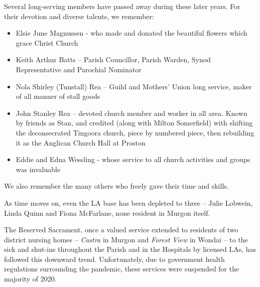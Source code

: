 \newpage


Several long-serving members have passed away during these later years. For their devotion and diverse talents, we remember:



\begin{itemize}

\item

  Elsie June Magnussen - who made and donated the beautiful flowers which grace Christ Church

\item

  Keith Arthur Batts -- Parish Councillor, Parish Warden, Synod Representative and Parochial Nominator

\item

  Nola Shirley (Tunstall) Rea -- Guild and Mothers' Union long service, maker of all manner of stall goods

\item

  John Stanley Rea -- devoted church member and worker in all area. Known by friends as Stan, and credited (along with Milton Somerfield) with shifting the deconsecrated Tingoora church, piece by numbered piece, then rebuilding it as the Anglican Church Hall at Proston

\item

  Eddie and Edna Wessling - whose service to all church activities and groups was invaluable

\end{itemize}



We also remember the many others who freely gave their time and skills.



\balance


As time moves on, even the LA base has been depleted to three -- Julie Lobwein, Linda Quinn and Fiona McFarlane, none resident in Murgon itself.



The Reserved Sacrament, once a valued service extended to residents of two district nursing homes -- \emph{Castra} in Murgon and \emph{Forest View} in Wondai -- to the sick and shut-ins throughout the Parish and in the Hospitals by licensed LAs, has followed this downward trend. Unfortunately, due to government health regulations surrounding the pandemic, these services were suspended for the majority of 2020.



